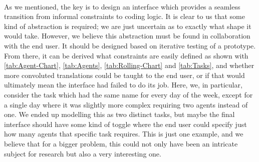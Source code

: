 \\
As we mentioned, the key is to design an interface which provides a seamless transition from informal constraints to coding logic. It is clear to us that some kind of abstraction is required; we are just uncertain as to exactly what shape it would take. However, we believe this abstraction must be found in collaboration with the end user. It should be designed based on iterative testing of a prototype. From there, it can be derived what constraints are easily defined as shown with \autoref{tab:Agent-Chart}, \autoref{tab:Agents}, \autoref{tab:Rolling-Chart} and \autoref{tab:Tasks}, and whether more convoluted translations could be taught to the end user, or if that would ultimately mean the interface had failed to do its job. Here, we, in particular, consider the task which had the same name for every day of the week, except for a single day where it was slightly more complex requiring two agents instead of one. We ended up modelling this as two distinct tasks, but maybe the final interface should have some kind of toggle where the end user could specify just how many agents that specific task requires. This is just one example, and we believe that for a bigger problem, this could not only have been an intricate subject for research but also a very interesting one.

